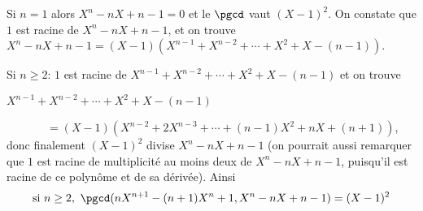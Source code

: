 {\begin{enumerate}
{Si $n=1$ alors $X^n-nX+n-1=0$ et le $\pgcd$ vaut $(X-1)^2$.
On constate que $1$ est racine de $X^n-nX+n-1$, 
et on trouve $X^n-nX+n-1=(X-1)(X^{n-1}+X^{n-2}+\cdots+X^2+X-(n-1))$.

Si $n\ge 2$: $1$ est racine de $X^{n-1}+X^{n-2}+\cdots+X^2+X-(n-1)$ et on trouve 

$X^{n-1}+X^{n-2}+\cdots+X^2+X-(n-1)$

\ \ \ \ \ \ \ $=(X-1)(X^{n-2}+2X^{n-3}+\cdots+(n-1)X^2+nX+(n+1))$, donc finalement 
$(X-1)^2$ divise $X^n-nX+n-1$ (on pourrait aussi remarquer 
que $1$ est racine de multiplicité au moins deux de 
$X^n-nX+n-1$, puisqu'il est racine de ce polynôme et de sa dérivée). 
Ainsi 
$$\text{si}\ n\ge 2,\ \pgcd(nX^{n+1}-(n+1)X^n+1,X^n-nX+n-1)=(X-1)^2$$}
\end{enumerate}
}